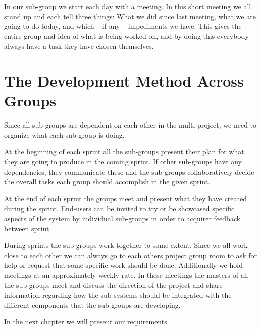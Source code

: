 In our sub-group we start each day with a \scrum{} meeting.
In this short meeting we all stand up and each tell three things: What we did since last \scrum{} meeting, what we are going to do today, and which -- if any -- impediments we have.
This gives the entire group and idea of what is being worked on, and by doing this everybody always have a task they have chosen themselves.

\section{The Development Method Across Groups} %
Since all sub-groups are dependent on each other in the multi-project, we need to organize what each sub-group is doing.

At the beginning of each sprint all the sub-groups present their plan for what they are going to produce in the coming sprint.
If other sub-groups have any dependencies, they communicate these and the sub-groups collaboratively decide the overall tasks each group should accomplish in the given sprint.

At the end of each sprint the groups meet and present what they have created during the sprint.
End-users can be invited to try or be showcased specific aspects of the system by individual sub-groups in order to acquirer feedback between sprint.

During sprints the sub-groups work together to some extent.
Since we all work close to each other we can always go to each others project group room to ask for help or request that some specific work should be done.
Additionally we hold \sos{} meetings at an approximately weekly rate.
In these meetings the \scrum{} masters of all the sub-groups meet and discuss the direction of the project and share information regarding how the sub-systems should be integrated with the different components that the sub-groups are developing.

In the next chapter we will present our requirements.


